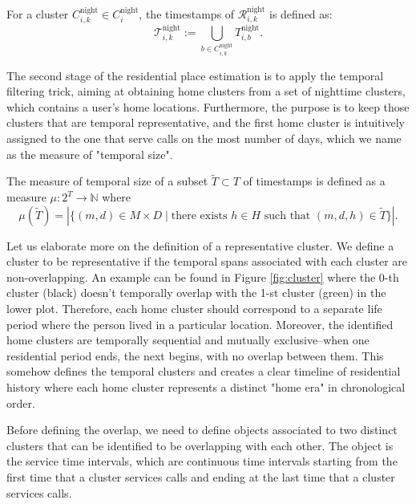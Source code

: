 \begin{definition}
For a cluster $C^{\text{night}}_{i, k} \in C^{\text{night}}_i$, the timestamps of $\mathcal{R}^{\text{night}}_{i, k}$ is defined as:
$$
\mathcal{T}^{\text{night}}_{i, k} := \bigcup_{b \in C^{\text{night}}_{i, k}} T^{\text{night}}_{i, b}.
$$
\end{definition}

The second stage of the residential place estimation is to apply the temporal filtering trick, aiming at obtaining home clusters from a set of nighttime clusters, which contains a user's home locations.
Furthermore, the purpose is to keep those clusters that are temporal representative, and the first home cluster is intuitively assigned to the one that serve calls on the most number of days, which we name as the measure of "temporal size".

\begin{function}\label{def:temporal_size}
The measure of temporal size of a subset $\tilde{T} \subset T$ of timestamps is defined as a measure  $\mu: 2^T \rightarrow \mathbb{N}$ where
\begin{equation}\label{eq:temporal_size}
\mu(\tilde{T}) =
|
\{
(m, d) \in M \times D
\mid
\text{there exists } h \in H \text{ such that } (m, d, h) \in \tilde{T}
\}
|.
\end{equation}
\end{function}

Let us elaborate more on the definition of a representative cluster.
We define a cluster to be representative if the temporal spans associated with each cluster are non-overlapping.
An example can be found in Figure \ref{fig:cluster} where the 0-th cluster (black) doesn't temporally overlap with the 1-st cluster (green) in the lower plot.
Therefore, each home cluster should correspond to a separate life period where the person lived in a particular location. Moreover, the identified home clusters are temporally sequential and mutually exclusive--when one residential period ends, the next begins, with no overlap between them.
This somehow defines the temporal clusters and creates a clear timeline of residential history where each home cluster represents a distinct "home era" in chronological order.


Before defining the overlap, we need to define objects associated to two distinct clusters that can be identified to be overlapping with each other.
The object is the service time intervals, which are continuous time intervals starting from the first time that a cluster services calls and ending at the last time that a cluster services calls.

